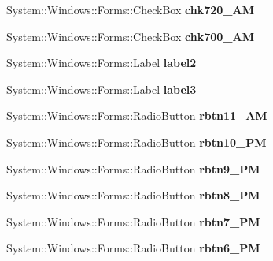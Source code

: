 \begin{DoxyCompactItemize}
System\+::\+Windows\+::\+Forms\+::\+Check\+Box {\bfseries chk720\+\_\+AM}
\item 
\mbox{\label{class_project1_1_1_my_form_aa3e9a50d48e9a11c314fdd5aecdda063}} 
System\+::\+Windows\+::\+Forms\+::\+Check\+Box {\bfseries chk700\+\_\+AM}
\item 
\mbox{\label{class_project1_1_1_my_form_a66b8c2e09b86d7778305bb2c973da29a}} 
System\+::\+Windows\+::\+Forms\+::\+Label {\bfseries label2}
\item 
\mbox{\label{class_project1_1_1_my_form_a2c85a45446c18ed5f4cf7a8445e55f2f}} 
System\+::\+Windows\+::\+Forms\+::\+Label {\bfseries label3}
\item 
\mbox{\label{class_project1_1_1_my_form_a094ff2d7d931cf8c2ff341c1b4677405}} 
System\+::\+Windows\+::\+Forms\+::\+Radio\+Button {\bfseries rbtn11\+\_\+AM}
\item 
\mbox{\label{class_project1_1_1_my_form_a8a44cb6964f31891b08ffcfee81a0f9e}} 
System\+::\+Windows\+::\+Forms\+::\+Radio\+Button {\bfseries rbtn10\+\_\+PM}
\item 
\mbox{\label{class_project1_1_1_my_form_ab0d0d7e81038f55003bb16c363b21809}} 
System\+::\+Windows\+::\+Forms\+::\+Radio\+Button {\bfseries rbtn9\+\_\+PM}
\item 
\mbox{\label{class_project1_1_1_my_form_ae530e2dcf58b5163edd4ec5ad282dc66}} 
System\+::\+Windows\+::\+Forms\+::\+Radio\+Button {\bfseries rbtn8\+\_\+PM}
\item 
\mbox{\label{class_project1_1_1_my_form_a09764aa85e82c1cbc2a39d52acd0d7c6}} 
System\+::\+Windows\+::\+Forms\+::\+Radio\+Button {\bfseries rbtn7\+\_\+PM}
\item 
\mbox{\label{class_project1_1_1_my_form_aa9391ceb94b9e29ea04d0bf55da52c39}} 
System\+::\+Windows\+::\+Forms\+::\+Radio\+Button {\bfseries rbtn6\+\_\+PM}
\item 
\mbox{\label{class_project1_1_1_my_form_a4d9655b9adf007b8eb220b0304e77970}} 

\end{DoxyCompactItemize}
